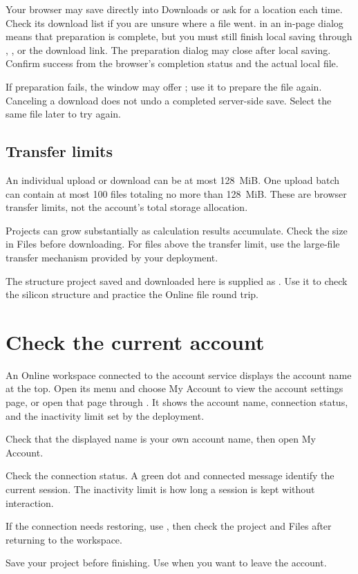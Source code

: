 Your browser may save directly into Downloads or ask for a location each time. Check its download list if you are unsure where a file went.  in an in-page dialog means that preparation is complete, but you must still finish local saving through , \mbox{}, or the download link. The preparation dialog may close after local saving. Confirm success from the browser's completion status and the actual local file.

If preparation fails, the window may offer ; use it to prepare the file again. Canceling a download does not undo a completed server-side save. Select the same file later to try again.

\subsection{Transfer limits}

An individual upload or download can be at most 128~MiB. One upload batch can contain at most 100 files totaling no more than 128~MiB. These are browser transfer limits, not the account's total storage allocation.

Projects can grow substantially as calculation results accumulate. Check the size in Files before downloading. For files above the transfer limit, use the large-file transfer mechanism provided by your deployment.

The structure project saved and downloaded here is supplied as . Use it to check the silicon structure and practice the Online file round trip.

\section{Check the current account}

An Online workspace connected to the account service displays the account name at the top. Open its menu and choose My Account to view the account settings page, or open that page through . It shows the account name, connection status, and the inactivity limit set by the deployment.

\begin{steps}
\item Check that the displayed name is your own account name, then open My Account.
\item Check the connection status. A green dot and connected message identify the current session. The inactivity limit is how long a session is kept without interaction.
\item If the connection needs restoring, use , then check the project and Files after returning to the workspace.
\item Save your project before finishing. Use  when you want to leave the account.
\end{steps}

